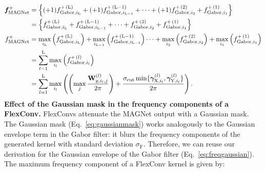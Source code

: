 \documentclass{article} \usepackage{iclr2022_conference,times}
\newcommand{\mat}[1]{\ensuremath{{\mathbf{\MakeUppercase{{#1}}}}}}
\newcommand{\Wm}{\mat{W}}
\def\Xt{\mathrm{X}}
\def\Yt{\mathrm{Y}}
\begin{document}
\begin{align}
    \boldsymbol{f}^+_{\textrm{MAGNet}} &= \left\{ (+1) f^{+\hspace{0.5mm}(\mathrm{L})}_{\mathrm{Gabor}, i_\mathrm{L}} + (+1)f^{+\hspace{0.5mm}(\mathrm{L}-1)}_{\mathrm{Gabor}, i_{\mathrm{L}-1}} + \cdots + (+1) f^{+\hspace{0.5mm}(2)}_{\mathrm{Gabor}, i_2} + f^{+\hspace{0.5mm}(1)}_{\mathrm{Gabor}, i_1}\right\} \label{eq:simplifysigns} \\
    &= \left\{ f^{+\hspace{0.5mm}(\mathrm{L})}_{\mathrm{Gabor}, i_\mathrm{L}} + f^{+\hspace{0.5mm}(\mathrm{L}-1)}_{\mathrm{Gabor}, i_{\mathrm{L}-1}} + \cdots + f^{+\hspace{0.5mm}(2)}_{\mathrm{Gabor}, i_2} + f^{+\hspace{0.5mm}(1)}_{\mathrm{Gabor}, i_1}\right\} \nonumber\\
    f^+_{\textrm{MAGNet}} &= \max_{i_\mathrm{L}}\left(f^{+\hspace{0.5mm}(\mathrm{L})}_{\mathrm{Gabor}, i_\mathrm{L}}\right) + \max_{i_{\mathrm{L}-1}}\left(f^{+\hspace{0.5mm}(\mathrm{L}-1)}_{\mathrm{Gabor}, i_{\mathrm{L}-1}}\right) \cdots + \max_{i_2}\left(f^{+\hspace{0.5mm}(2)}_{\mathrm{Gabor}, i_2}\right) + \max_{i_1}\left(f^{+\hspace{0.5mm}(1)}_{\mathrm{Gabor}, i_1}\right) \label{eq:simplifychannels} \\
    &= \sum_{l=1}^{\mathrm{L}} \max_{i_l}\left(f^{+\hspace{0.5mm}(l)}_{\mathrm{Gabor}, i_l}\right) \nonumber \\
    &= \sum_{l=1}^{\mathrm{L}} \max_{i_l}\left( \left( \max_{j} \frac{\Wm^{(l)}_{\mathrm{g}, i_l,j}}{2 \pi} \right) + \frac{\sigma_\mathrm{cut} \min\{\boldsymbol{\gamma}^{(l)}_{\Xt, i_l}, \boldsymbol{\gamma}^{(l)}_{\Yt,i_l}\}}{2 \pi}\right). \label{eq:magnetfreq}
\end{align}
\textbf{Effect of the Gaussian mask in the frequency components of a FlexConv.} FlexConvs attenuate the MAGNet output with a Gaussian mask. The Gaussian mask (Eq.~\ref{eq:gaussianmask}) works analogously to the Gaussian envelope term in the Gabor filter: it blurs the frequency components of the generated kernel with standard deviation $\sigma_{\mathrm{F}}$. Therefore, we can reuse our derivation for the Gaussian envelope of the Gabor filter (Eq.~\ref{eq:freqgaussian}). The maximum frequency component of a FlexConv kernel is given by:
\end{document}
